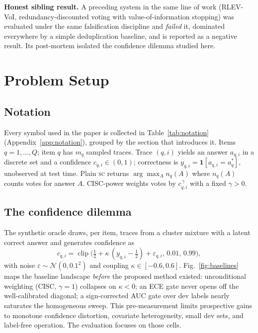 \documentclass{article}
\newcommand{\SC}{\textsc{sc}}
\begin{document}
\textbf{Honest sibling result.} A preceding system in the same line of work
(RLEV-VoI, redundancy-discounted voting with value-of-information stopping)
was evaluated under the same falsification discipline and \emph{failed} it,
dominated everywhere by a simple deduplication baseline, and is reported as a
negative result. Its post-mortem isolated the confidence dilemma studied
here.%


\section{Problem Setup}\label{sec:setup}

\subsection{Notation}
Every symbol used in the paper is collected in Table~\ref{tab:notation} (Appendix~\ref{app:notation}), grouped by the section that introduces it.
Items $q=1,\dots,Q$; item $q$ has $m_q$ sampled traces. Trace $(q,i)$ yields an answer $a_{q,i}$ in a discrete set and a confidence $c_{q,i}\in(0,1)$; correctness is $y_{q,i}=\mathbf{1}[a_{q,i}=a_q^\ast]$, unobserved at test time. Plain \SC{} returns $\arg\max_A n_q(A)$ where $n_q(A)$ counts votes for answer $A$. CISC-power weights votes by $c_{q,i}^{\,\gamma}$ with a fixed $\gamma>0$.

\subsection{The confidence dilemma}
The synthetic oracle draws, per item, traces from a cluster mixture with a latent correct answer and generates confidence as
\begin{equation}\label{eq:confmodel}
c_{q,i}=\operatorname{clip}\!\big(\tfrac12+\kappa\,(y_{q,i}-\tfrac12)+\varepsilon_{q,i},\,0.01,\,0.99\big),
\end{equation}
with noise $\varepsilon\sim\mathcal{N}(0,0.1^2)$ and coupling $\kappa\in[-0.6,0.6]$. Fig.~\ref{fig:baselines} maps the baseline landscape \emph{before} the proposed method existed: unconditional weighting (CISC, $\gamma=1$) collapses on $\kappa<0$; an ECE gate never opens off the well-calibrated diagonal; a sign-corrected AUC gate over dev labels nearly saturates the homogeneous sweep. This pre-measurement limits prospective gains to monotone confidence distortion, covariate heterogeneity, small dev sets, and label-free operation. The evaluation focuses on those cells.
\end{document}
